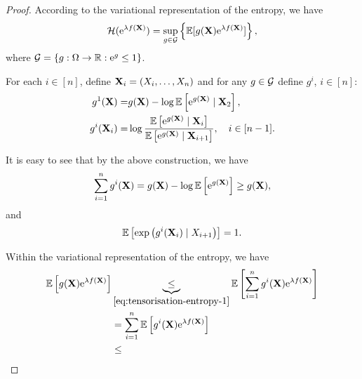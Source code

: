 \begin{proof}
	According to the variational representation of the entropy, we have
	\begin{equation*}
		\mathcal{H}(\mathrm{e}^{\lambda f(\mathbf{X})})=\sup_{g\in\mathcal{G}}\left\{\mathbb{E}[g(\mathbf{X})\mathrm{e}^{\lambda f(\mathbf{X})}]\right\},
	\end{equation*}
	where \(\mathcal{G}=\left\{g:\Omega\to\mathbb{R}:\mathrm{e}^{g}\leq 1\right\}\).

	For each \(i\in[n]\), define \(\mathbf{X}_{i}=(X_{i},\ldots, X_{n})\) and for any \(g\in\mathcal{G}\) define \(g^{i}\), \(i\in[n]\):
	\begin{equation*}
		\begin{aligned}
			g^{1}(\mathbf{X})=     & g(\mathbf{X})-\log\mathbb{E}\left[\mathrm{e}^{g(\mathbf{X})}\mid \mathbf{X}_{2}\right],                                                                      \\
			g^{i}(\mathbf{X}_{i})= & \log\frac{\mathbb{E}\left[\mathrm{e}^{g(\mathbf{X})}\mid \mathbf{X}_{i}\right]}{\mathbb{E}\left[\mathrm{e}^{g(\mathbf{X})}\mid \mathbf{X}_{i+1}\right]},\quad i\in[n-1].
		\end{aligned}
	\end{equation*}

	It is easy to see that by the above construction, we have
	\begin{equation}
		\label{eq:tensorisation-entropy-1}
		\sum_{i=1}^{n}g^{i}(\mathbf{X})=g(\mathbf{X})-\log\mathbb{E}\left[\mathrm{e}^{g(\mathbf{X})}\right]\geq g(\mathbf{X}),
	\end{equation}
	and
	\begin{equation*}
		\mathbb{E}\left[\exp\left(g^{i}(\mathbf{X}_{i})\mid X_{i+1}\right)\right]=1.
	\end{equation*}

	Within the variational representation of the entropy, we have
	\begin{equation*}
		\begin{aligned}
			\mathbb{E}\left[g(\mathbf{X})\mathrm{e}^{\lambda f(\mathbf{X})}\right] & \underbrace{\leq}_{\eqref{eq:tensorisation-entropy-1}}\mathbb{E}\left[\sum_{i=1}^{n}g^{i}(\mathbf{X})\mathrm{e}^{\lambda f(\mathbf{X})}\right] \\
			                                                     & =\sum_{i=1}^{n}\mathbb{E}\left[g^{i}(\mathbf{X})\mathrm{e}^{\lambda f(\mathbf{X})}\right]                                                      \\
			                                                     & \leq
		\end{aligned}
	\end{equation*}
\end{proof}

